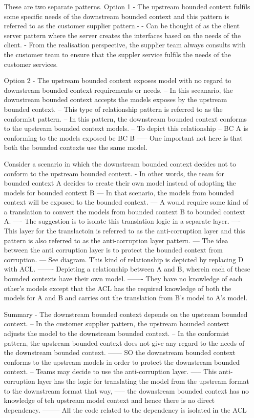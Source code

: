 These are two separate patterns.
Option 1 - The upstream bounded context fulfils some specific needs of the downstream bounded context and this pattern is referred to as the customer supplier pattern.-
- Can be thought of as the client server pattern where the server creates the interfaces based on the needs of the client.
- From the realisation perspective, the supplier team always consults with the customer team to ensure that the suppler service fulfils the needs of the customer services.

Option 2 - The upstream bounded context exposes model with no regard to downstream bounded context requirements or needs.
-- In this sceanario, the downstream bounded context accepts the models exposes by the upstream bounded context.
-- This type of relationship pattern is referred to as the conformist pattern.
-- In this pattern, the downstream bounded context conforms to the upstream bounded context models.
-- To depict this relationship %
-- BC A is conforming to the models exposed be BC B
----- One important not here is that both the bounded contexts use the same model.


Consider a scenario in which the downstream bounded context decides not to conform to the upstream bounded context.
- In other words, the team for bounded context A decides to create their own model instead of adopting the models for bounded context B
--- In that scenario, the models from bounded context will be exposed to the bounded context.
--- A would require some kind of a translation to convert the models from bounded context B to bounded context A.
---- The suggestion is to isolate this translation logic in a separate layer.
---- This layer for the translactoin is referred to as the anti-corruption layer and this pattern is also referred to as the anti-corruption layer pattern.
--- The idea between the anti corruption layer is to protect the bounded context from corruption.
--- See diagram. This kind of relationship is depicted by replacing D with ACL.
------- Depicting a relationship between A and B, wherein each of these bounded contexts have their own model.
------- They have no knowledge of each other's models except that the ACL has the required knowledge of both the models for A and B and carries out the translation from B's model to A's model.

Summary
- The downstream bounded context depends on the upstream bounded context.
-- In the customer supplier pattern, the upstream bounded context adjusts the model to the downstream bounded context.
-- In the conformist pattern, the upstream bounded context does not give any regard to the needs of the downstream bounded context.
------ SO the downstream bounded context conforms to the upstream models in order to protect the downstream bounded context.
-- Teams may decide to use the anti-corruption layer.
----- This anti-corruption layer has the logic for translating the model from the upstream format to the downstream format that way,
----- the downstream bounded context has no knowledge of teh upstream model context and hence there is no direct dependency.
-------- All the code related to the dependency is isolated in the ACL


